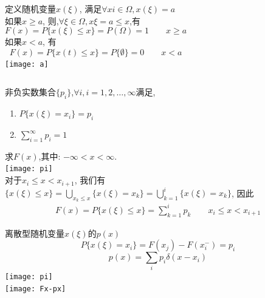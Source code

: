 \begin{frame}
\begin{columns}
	定义随机变量$x(\xi)$, 满足$\forall xi\in\Omega, x(\xi)=a$\\
	如果$x\ge a$, 则,$\forall \xi\in\Omega, x{\xi}=a\le x$,有
	\[F(x)=P\{x(\xi)\le x \}=P(\Omega)= 1\qquad x\ge a \] 
	如果$x<a$, 有
	\[F(x)=P\{x(t)\le x \}=P\{\emptyset\}=0 \qquad x<a \] 
	\texttt{[image: a]}
\end{columns}
\end{frame}

\begin{frame}[shrink]
非负实数集合$\{p_i\}$,$\forall i, i=1,2,\dots,\infty$满足, 
\begin{enumerate}
	\item $P\{x(\xi)=x_i\}=p_i$
	\item $\sum\limits_{i=1}^{\infty}p_i=1$
\end{enumerate}
求$F(x)$,其中: $-\infty<x<\infty$.\\
\texttt{[image: pi]}\\
对于$x_i\le x<x_{i+1}$, 我们有$\{x(\xi)\le x \}=\bigcup\limits_{x_k\le x}\{x(\xi)=x_k\}=\bigcup\limits_{k=1}^{i}\{x(\xi)=x_k\}$, 因此
\begin{align*}
F(x)=P\{x(\xi)\le x\}=\sum\limits_{k=1}^{i}p_k \qquad x_i\le x<x_{i+1}
\end{align*}
\end{frame}

\begin{frame}{离散型随机变量$x(\xi)$的$p(x)$}
\[P\{x(\xi)=x_i\}=F(x_j)-F(x_i^{-})=p_i\]
\[p(x)=\sum\limits_{i}p_i\delta(x-x_i) \]
\texttt{[image: pi]}\\
\texttt{[image: Fx-px]}
\end{frame}

